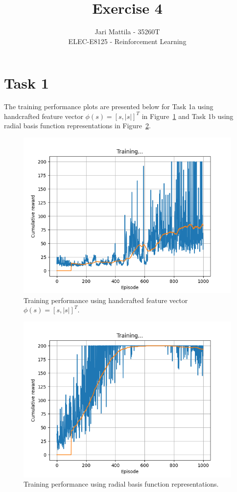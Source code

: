 \documentclass[12pt]{article}
\begin{document}
 
\title{Exercise 4}
\author{Jari Mattila - 35260T\\
ELEC-E8125 - Reinforcement Learning}

\maketitle

\section*{Task 1}

The training performance plots are presented below for Task 1a using 
handcrafted feature vector $\phi(s) = [s,|s|]^T$ in Figure~\ref*{fig:fig1} and Task 1b 
using radial basis function representations in Figure~\ref*{fig:fig2}.
\newline

\begin{figure}[h] 
	\centering  %
    \includegraphics[width=0.9\columnwidth]{img/Figure_1_task_1a_cumulative_reward.png}
	\caption{Training performance using handcrafted feature vector $\phi(s) = [s,|s|]^T$.}
	\label{fig:fig1}
\end{figure}

\begin{figure}[h] 
	\centering  %
    \includegraphics[width=0.9\columnwidth]{img/Figure_2_task_1b_cumulative_reward.png}
	\caption{Training performance using radial basis function representations.}
	\label{fig:fig2}
\end{figure}
\end{document}

